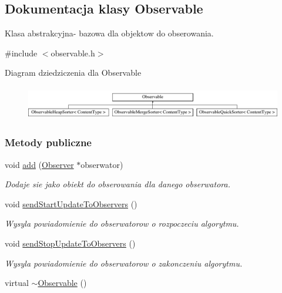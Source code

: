\hypertarget{class_observable}{\subsection{Dokumentacja klasy Observable}
\label{class_observable}
}


Klasa abstrakcyjna-\/ bazowa dla objektow do obserowania.  




{\ttfamily \#include $<$observable.\-h$>$}

Diagram dziedziczenia dla Observable\begin{figure}[H]
\begin{center}
\leavevmode
\includegraphics[height=1.475626cm]{class_observable}
\end{center}
\end{figure}
\subsubsection*{Metody publiczne}
\begin{DoxyCompactItemize}
\item 
void \hyperlink{class_observable_a18e7700c59126dbeb97d24844c6ed131}{add} (\hyperlink{class_observer}{Observer} $\ast$obserwator)
\begin{DoxyCompactList}\small\item\em Dodaje sie jako obiekt do obserowania dla danego obserwatora. \end{DoxyCompactList}\item 
void \hyperlink{class_observable_a78df64057f152342a43f27979186a6ba}{send\-Start\-Update\-To\-Observers} ()
\begin{DoxyCompactList}\small\item\em Wysyla powiadomienie do obserwatorow o rozpoczeciu algorytmu. \end{DoxyCompactList}\item 
void \hyperlink{class_observable_a16f75ed1514a0cb7526b5a5d2b7ca7c6}{send\-Stop\-Update\-To\-Observers} ()
\begin{DoxyCompactList}\small\item\em Wysyla powiadomienie do obserwatorow o zakonczeniu algorytmu. \end{DoxyCompactList}\item 
virtual \hyperlink{class_observable_a42f551d4d64ffa48a2ea8d7f0a4e42d4}{$\sim$\-Observable} ()
\end{DoxyCompactItemize}
